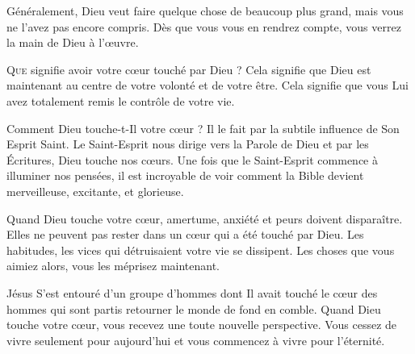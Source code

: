 
Généralement, Dieu veut faire quelque chose de beaucoup plus grand,
 mais vous ne l'avez pas encore compris.
 Dès que vous vous en rendrez compte, vous verrez la main de Dieu à l'\oe{}uvre. 

\dvrule






\lettrine{Q}{ue} signifie avoir votre c\oe{}ur touché par Dieu ?
 Cela signifie que Dieu est maintenant au centre de votre volonté
 et de votre être.
 Cela signifie que vous Lui avez totalement remis le contrôle de votre vie.

Comment Dieu touche-t-Il votre c\oe{}ur ?
 Il le fait par la subtile influence de Son Esprit Saint. 
 Le Saint-Esprit nous dirige vers la Parole de Dieu et par les Écritures,
 Dieu touche nos c\oe{}urs.
 Une fois que le Saint-Esprit commence à illuminer nos pensées,
 il est incroyable de voir comment la Bible devient merveilleuse,
 excitante, et glorieuse.

Quand Dieu touche votre c\oe{}ur, amertume, anxiété et peurs doivent disparaître.
 Elles ne peuvent pas rester dans un c\oe{}ur qui a été touché par Dieu.
 Les habitudes, les vices qui détruisaient votre vie se dissipent.
 Les choses que vous aimiez alors, vous les méprisez maintenant.


Jésus S'est entouré d'un groupe d'hommes dont Il avait touché le c\oe{}ur
 \ocadr des hommes qui sont partis retourner le monde de fond en comble.
 Quand Dieu touche votre c\oe{}ur, vous recevez une toute nouvelle perspective.
 Vous cessez de vivre seulement pour aujourd'hui et vous commencez
 à vivre pour l'éternité. 

